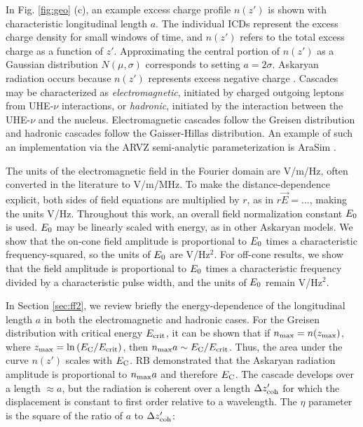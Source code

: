 \documentclass[amsmath,amssymb,aps,prd,10pt,twocolumn]{revtex4}
\begin{document}
In Fig. \ref{fig:geo} (c), an example excess charge profile $n(z')$ is shown with characteristic longitudinal length $a$.  The individual ICDs represent the excess charge density for small windows of time, and $n(z')$ refers to the total excess charge as a function of $z'$.  Approximating the central portion of $n(z')$ as a Gaussian distribution $N(\mu,\sigma)$ corresponds to setting $a = 2 \sigma$.  Askaryan radiation occurs because $n(z')$ represents excess negative charge \cite{zhs,PhysRevD.65.103002,10.1016/j.astropartphys.2017.03.008}.  Cascades may be characterized as \textit{electromagnetic}, initiated by charged outgoing leptons from UHE-$\nu$ interactions, or \textit{hadronic}, initiated by the interaction between the UHE-$\nu$ and the nucleus.  Electromagnetic cascades follow the Greisen distribution and hadronic cascades follow the Gaisser-Hillas distribution.  An example of such an implementation via the ARVZ semi-analytic parameterization is AraSim \cite{10.1016/j.astropartphys.2011.11.010}.

The units of the electromagnetic field in the Fourier domain are V/m/Hz, often converted in the literature to V/m/MHz. To make the distance-dependence explicit, both sides of field equations are multiplied by $r$, as in $r\vec{E} = ... $, making the units V/Hz. Throughout this work, an overall field normalization constant $E_{\rm 0}$ is used.  $E_{\rm 0}$ may be linearly scaled with energy, as in other Askaryan models.  We show that the on-cone field amplitude is proportional to $E_{\rm 0}$ times a characteristic frequency-squared, so the units of $E_{\rm 0}$ are V/Hz$^2$.  For off-cone results, we show that the field amplitude is proportional to $E_{\rm 0}$ times a characteristic frequency divided by a characteristic pulse width, and the units of $E_{\rm 0}$ remain V/Hz$^2$.

In Section \ref{sec:ff2}, we review briefly the energy-dependence of the longitudinal length $a$ in both the electromagnetic and hadronic cases.  For the Greisen distribution with critical energy $E_{\rm crit}$, it can be shown that if $n_{\rm max} = n(z_{\rm max})$, where $z_{\rm max} = \ln{(E_{\rm C}/E_{\rm crit})}$, then $n_{\rm max} a \sim E_{\rm C}/E_{\rm crit}$.  Thus, the area under the curve $n(z')$ scales with $E_{\rm C}$.  RB demonstrated that the Askaryan radiation amplitude is proportional to $n_{\rm max} a$ and therefore $E_{\rm C}$.  The cascade develops over a length $\approx a$, but the radiation is coherent over a length $\Delta z'_{\rm coh}$ for which the displacement is constant to first order relative to a wavelength.  The $\eta$ parameter is the square of the ratio of $a$ to $\Delta z'_{\rm coh}$:
\end{document}
